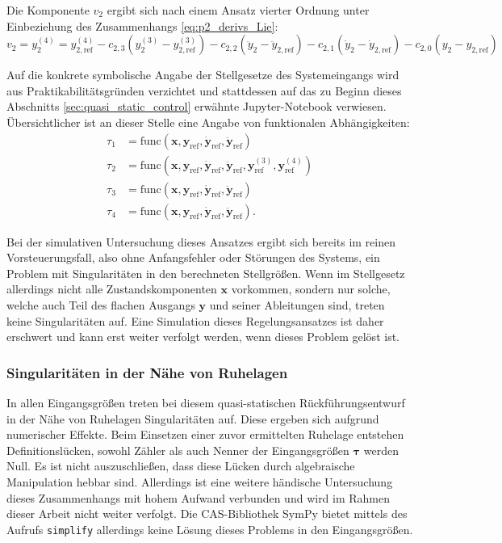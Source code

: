 Die Komponente $v_2$ ergibt sich nach einem Ansatz vierter Ordnung unter Einbeziehung des Zusammenhangs \eqref{eq:p2_derivs_Lie}:
\begin{equation}
	v_2 = y_2^{(4)} = y_{2, \text{ref}}^{(4)} - c_{2, 3} (y_2^{(3)} - y_{2, \text{ref}}^{(3)}) - c_{2, 2} (\ddot{y}_2 - \ddot{y}_{2, \text{ref}}) - c_{2, 1} (\dot{y}_2 - \dot{y}_{2, \text{ref}}) - c_{2, 0} (y_2 - y_{2, \text{ref}})
\end{equation} 

Auf die konkrete symbolische Angabe der Stellgesetze des Systemeingangs wird aus Praktikabilitätsgründen verzichtet und stattdessen auf das zu Beginn dieses Abschnitts \ref{sec:quasi_static_control} erwähnte Jupyter-Notebook verwiesen. Übersichtlicher ist an dieser Stelle eine Angabe von funktionalen Abhängigkeiten:
\begin{subequations}
	\begin{align}
		\tau_1 &= \mathrm{func}(\mathbf{x}, \mathbf{y}_{\mathrm{ref}}, \dot{\mathbf{y}}_{\mathrm{ref}}, \ddot{\mathbf{y}}_{\mathrm{ref}}) \\
		\tau_2 &= \mathrm{func}(\mathbf{x}, \mathbf{y}_{\mathrm{ref}}, \dot{\mathbf{y}}_{\mathrm{ref}}, \ddot{\mathbf{y}}_{\mathrm{ref}}, \mathbf{y}_{\mathrm{ref}}^{(3)}, \mathbf{y}_{\mathrm{ref}}^{(4)}) \\
		\tau_3 &=\mathrm{func}(\mathbf{x}, \mathbf{y}_{\mathrm{ref}}, \dot{\mathbf{y}}_{\mathrm{ref}}, \ddot{\mathbf{y}}_{\mathrm{ref}}) \\
		\tau_4 &= \mathrm{func}(\mathbf{x}, \mathbf{y}_{\mathrm{ref}}, \dot{\mathbf{y}}_{\mathrm{ref}}, \ddot{\mathbf{y}}_{\mathrm{ref}}).
	\end{align}
\end{subequations}

Bei der simulativen Untersuchung dieses Ansatzes ergibt sich bereits im reinen Vorsteuerungsfall, also ohne Anfangsfehler oder Störungen des Systems, ein Problem mit Singularitäten in den berechneten Stellgrößen. Wenn im Stellgesetz allerdings nicht alle Zustandskomponenten $\mathbf{x}$ vorkommen, sondern nur solche, welche auch Teil des flachen Ausgangs $\mathbf{y}$ und seiner Ableitungen sind, treten keine Singularitäten auf. Eine Simulation dieses Regelungsansatzes ist daher erschwert und kann erst weiter verfolgt werden, wenn dieses Problem gelöst ist.

\subsubsection{Singularitäten in der Nähe von Ruhelagen}
In allen Eingangsgrößen treten bei diesem quasi-statischen Rückführungsentwurf in der Nähe von Ruhelagen Singularitäten auf. Diese ergeben sich aufgrund numerischer Effekte. Beim Einsetzen einer zuvor ermittelten Ruhelage entstehen Definitionslücken, sowohl Zähler als auch Nenner der Eingangsgrößen $\boldsymbol{\tau}$ werden Null. Es ist nicht auszuschließen, dass diese Lücken durch algebraische Manipulation hebbar sind. Allerdings ist eine weitere händische Untersuchung dieses Zusammenhangs mit hohem Aufwand verbunden und wird im Rahmen dieser Arbeit nicht weiter verfolgt. Die CAS-Bibliothek SymPy bietet mittels des Aufrufs \texttt{simplify} allerdings keine Lösung dieses Problems in den Eingangsgrößen.

